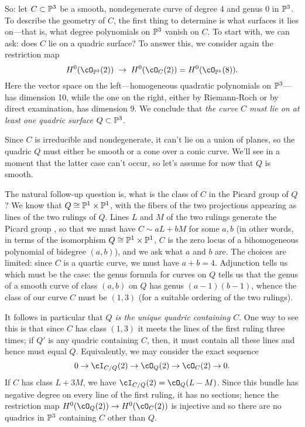 So: let $C \subset \PP^3$ be a smooth, nondegenerate curve of degree 4 and genus 0 in $\PP^3$. To describe the geometry of $C$, the first thing to determine is what surfaces it lies on---that is, what degree polynomials on $\PP^3$ vanish on $C$. 
To start with, we can ask: does $C$ lie on a quadric surface? To answer this, we consider again the restriction map
$$
H^0(\cO_{\PP^3}(2)) \; \to \; H^0(\cO_{C}(2)) = H^0(\cO_{\PP^1}(8)).
$$
Here the vector space on the left---homogeneous quadratic polynomials on $\PP^3$---has dimension 10, while the one on the right, either by Riemann-Roch or by direct examination, has dimension 9. We conclude that \emph{the curve $C$ must lie on at least one quadric surface $Q \subset \PP^3$}.

Since $C$ is irreducible and nondegenerate, it can't lie on a union of planes, so the quadric $Q$ must either be smooth or a cone over a conic curve. We'll see in a moment that the latter case can't occur, so let's assume for now that $Q$ is smooth. 

The natural follow-up question is, what is the class of $C$ in the Picard group of $Q$? We know that $Q \cong \PP^1 \times \PP^1$, with the fibers of the two projections appearing as lines of the two rulings of $Q$. Lines $L$ and $M$ of the two rulings generate the Picard group \cite[***]{H}, so that we must have $C \sim aL + bM$ for some $a, b$ (in other words, in terms of the isomorphism $Q \cong \PP^1 \times \PP^1$, $C$ is the zero locus of a bihomogeneous polynomial of bidegree $(a,b)$), and we ask what $a$ and $b$ are. The choices are limited: since $C$ is a quartic curve, we must have $a+b = 4$. Adjunction \cite[***]{H} tells us which must be the case: the genus formula for curves on $Q$ tells us that the genus of a smooth curve of class $(a,b)$ on $Q$ has genus $(a-1)(b-1)$, whence the class of our curve $C$ must be $(1,3)$ (for a suitable ordering of the two rulings).

It follows in particular that \emph{$Q$ is the unique quadric containing $C$}. One way to see this is that since $C$ has class $(1,3)$ it meets the lines of the first ruling three times; if $Q'$ is any quadric containing $C$, then, it must contain all these lines and hence must equal $Q$. Equivalently, we may consider the exact sequence
$$
0 \to \cI_{C/Q}(2) \to \cO_Q(2)  \to \cO_C(2) \to 0.
$$
If $C$ has class $L+3M$, we have $\cI_{C/Q}(2) = \cO_{Q}(L-M)$. Since this bundle has negative degree on every line of the first ruling, it has no sections; hence the restriction map $H^0(\cO_Q(2))  \to H^0(\cO_C(2))$ is injective and so there are no  quadrics in $\PP^3$ containing $C$ other than $Q$.


